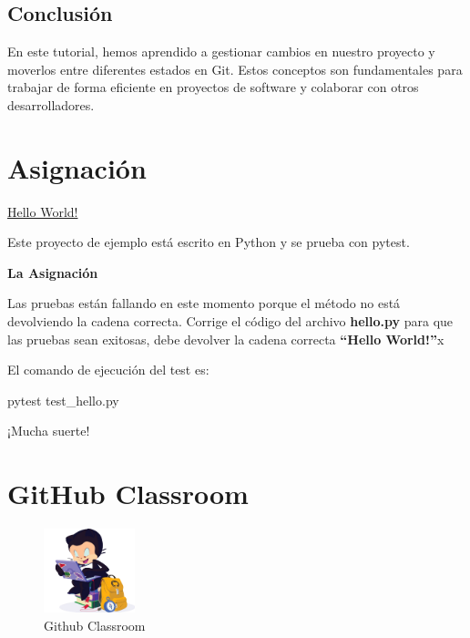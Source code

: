 \documentclass[
  a4paper,
  DIV=11,
  numbers=noendperiod,
  onepage,
  openany]{scrreprt}
\newenvironment{Shaded}{\begin{snugshade}}{\end{snugshade}}
\newcommand{\ExtensionTok}[1]{\textcolor[rgb]{0.00,0.23,0.31}{#1}}
\newcommand{\NormalTok}[1]{\textcolor[rgb]{0.00,0.23,0.31}{#1}}
\begin{document}
\section{Conclusión}\label{conclusiuxf3n}

En este tutorial, hemos aprendido a gestionar cambios en nuestro
proyecto y moverlos entre diferentes estados en Git. Estos conceptos son
fundamentales para trabajar de forma eficiente en proyectos de software
y colaborar con otros desarrolladores.

\chapter{Asignación}\label{asignaciuxf3n}

\href{https://classroom.github.com/a/o-qydr2W}{Hello World!}

Este proyecto de ejemplo está escrito en Python y se prueba con pytest.

\textbf{La Asignación}

Las pruebas están fallando en este momento porque el método no está
devolviendo la cadena correcta. Corrige el código del archivo
\textbf{hello.py} para que las pruebas sean exitosas, debe devolver la
cadena correcta \textbf{``Hello World!''}x

El comando de ejecución del test es:

\begin{Shaded}
\begin{Highlighting}[]
\ExtensionTok{pytest}\NormalTok{ test\_hello.py}
\end{Highlighting}
\end{Shaded}

¡Mucha suerte!

\chapter{GitHub Classroom 📒}\label{github-classroom}

\begin{figure}[H]

{\centering \includegraphics[width=1.04167in,height=\textheight]{unidades/unidad1/../../images/github classroom.png}

}

\caption{Github Classroom}

\end{figure}%
\end{document}
